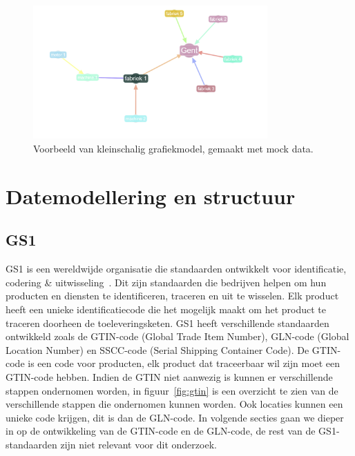 \begin{figure}[H]
     \centering
     \includegraphics[width=0.8\textwidth]{./img/grapmodel_example.png}
     \caption[Voorbeeld Grafiekmodel.]{\label{fig:graphmodel}Voorbeeld van kleinschalig grafiekmodel, gemaakt met mock data.}
\end{figure}

\section{Datemodellering en structuur}
\subsection{GS1}
GS1 is een wereldwijde organisatie die standaarden ontwikkelt voor identificatie, codering \& uitwisseling~\autocite{GS1standards}.
Dit zijn standaarden die bedrijven helpen om hun producten en diensten te identificeren, traceren en uit te wisselen.
Elk product heeft een unieke identificatiecode die het mogelijk maakt om het product te traceren doorheen de toeleveringsketen.
GS1 heeft verschillende standaarden ontwikkeld zoals de GTIN-code (Global Trade Item Number), GLN-code (Global Location Number) en SSCC-code (Serial Shipping Container Code).
De GTIN-code is een code voor producten, elk product dat traceerbaar wil zijn moet een GTIN-code hebben. 
Indien de GTIN niet aanwezig is kunnen er verschillende stappen ondernomen worden, in figuur~\ref{fig:gtin} is een overzicht te zien van de verschillende stappen die ondernomen kunnen worden.
Ook locaties kunnen een unieke code krijgen, dit is dan de GLN-code. In volgende secties gaan we dieper in op de ontwikkeling van de GTIN-code en de GLN-code, de rest van de GS1-standaarden zijn niet relevant voor dit onderzoek.

